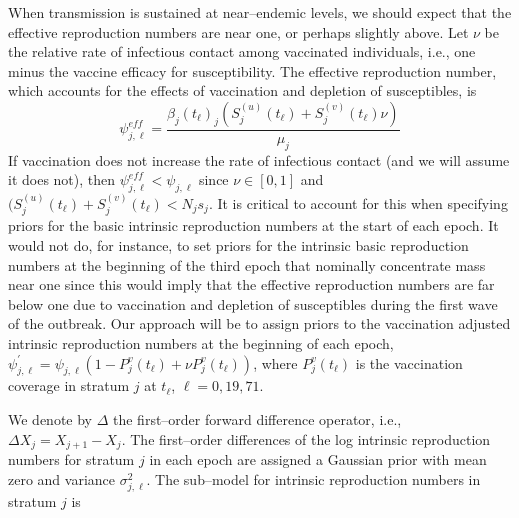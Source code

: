 When transmission is sustained at near--endemic levels, we should expect that the effective reproduction numbers are near one, or perhaps slightly above. Let $ \nu $ be the relative rate of infectious contact among vaccinated individuals, i.e., one minus the vaccine efficacy for susceptibility. The effective reproduction number, which accounts for the effects of vaccination and depletion of susceptibles, is 
\begin{equation}
\label{eqn:Reff_t}
\psi_{j,\ell}^{eff} = \frac{\beta_j(t_\ell)_j\left (S^{(u)}_j(t_\ell) + S^{(v)}_j(t_\ell)\nu\right )}{\mu_j}
\end{equation}
If vaccination does not increase the rate of infectious contact (and we will assume it does not), then $ \psi_{j,\ell}^{eff} < \psi_{j,\ell} $ since $ \nu\in[0,1] $ and $ (S^{(u)}_j(t_\ell) + S^{(v)}_j(t_\ell) < N_js_j $. It is critical to account for this when specifying priors for the basic intrinsic reproduction numbers at the start of each epoch. It would not do, for instance, to set priors for the intrinsic basic reproduction numbers at the beginning of the third epoch that nominally concentrate mass near one since this would imply that the effective reproduction numbers are far below one due to vaccination and depletion of susceptibles during the first wave of the outbreak. Our approach will be to assign priors to the vaccination adjusted intrinsic reproduction numbers at the beginning of each epoch, $ \psi_{j,\ell}^\prime = \psi_{j,\ell}  \left (1 - P^v_j(t_\ell) + \nu P^v_j(t_\ell)\right ) $, where $ P_j^v(t_\ell) $ is the vaccination coverage in stratum $ j $ at $ t_\ell $, $ \ell = 0,19,71 $. 

We denote by $ \Delta $ the first--order forward difference operator, i.e., $ \Delta X_j = X_{j+1} - X_j $. The first--order differences of the log intrinsic reproduction numbers for stratum $ j $ in each epoch are assigned a Gaussian prior with mean zero and variance $ \sigma^2_{j,\ell} $. The sub--model for intrinsic reproduction numbers in stratum $ j $ is

